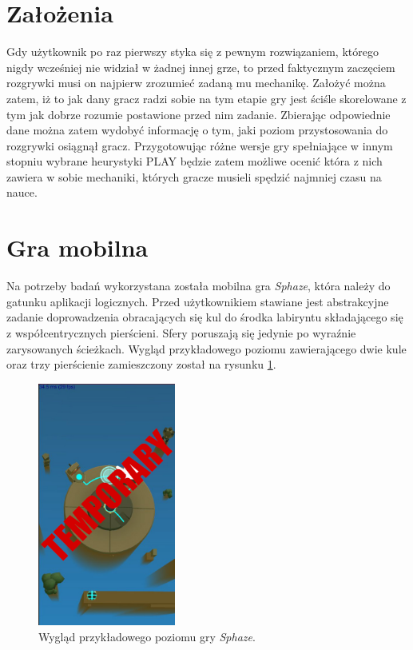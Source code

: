 \documentclass[a4paper,12pt,numbers=noenddot]{report}
\begin{document}
\section{Założenia}
Gdy użytkownik po raz pierwszy styka się z pewnym rozwiązaniem, którego nigdy wcześniej nie widział w żadnej innej grze, to przed faktycznym zaczęciem rozgrywki musi on najpierw zrozumieć zadaną mu mechanikę. Założyć można zatem, iż to jak dany gracz radzi sobie na tym etapie gry jest ściśle skorelowane z tym jak dobrze rozumie postawione przed nim zadanie. Zbierając odpowiednie dane można zatem wydobyć informację o tym, jaki poziom przystosowania do rozgrywki osiągnął gracz. Przygotowując różne wersje gry spełniające w innym stopniu wybrane heurystyki PLAY będzie zatem możliwe ocenić która z nich zawiera w sobie mechaniki, których gracze musieli spędzić najmniej czasu na nauce.

\section{Gra mobilna}
Na potrzeby badań wykorzystana została mobilna gra \textit{Sphaze}, która należy do gatunku aplikacji logicznych. Przed użytkownikiem stawiane jest abstrakcyjne zadanie doprowadzenia obracających się kul do środka labiryntu składającego się z współcentrycznych pierścieni. Sfery poruszają się jedynie po wyraźnie zarysowanych ścieżkach. Wygląd przykładowego poziomu zawierającego dwie kule oraz trzy pierścienie zamieszczony został na rysunku \ref{fig:sphaze_1}.

\begin{figure}[h!]
	\centering
  	\includegraphics[height=8cm]{fig/tmp.jpg}
	\caption{Wygląd przykładowego poziomu gry \textit{Sphaze}.}
	\label{fig:sphaze_1}
\end{figure}
\end{document}

